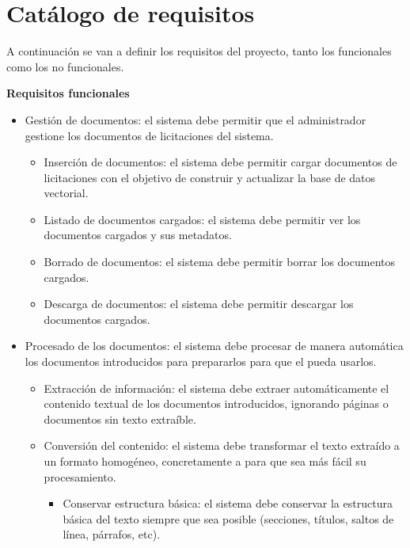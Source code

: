 \section{Catálogo de requisitos} \label{req:req}

A continuación se van a definir los requisitos del proyecto, tanto los funcionales como los no funcionales.

\textbf{Requisitos funcionales}

\begin{itemize}
\tightlist
	\item {} Gestión de documentos: el sistema debe permitir que el administrador gestione los documentos de licitaciones del sistema. 
	\begin{itemize}
	\tightlist
		\item {} Inserción de documentos: el sistema debe permitir cargar documentos de licitaciones con el objetivo de construir y actualizar la base de datos vectorial.
		\item {} Listado de documentos cargados: el sistema debe permitir ver los documentos cargados y sus metadatos.
		\item {} Borrado de documentos: el sistema debe permitir borrar los documentos cargados.
		\item {} Descarga de documentos: el sistema debe permitir descargar los documentos cargados.
	\end{itemize}
	\item {} Procesado de los documentos: el sistema debe procesar de manera automática los documentos introducidos para prepararlos para que el  pueda usarlos.
	\begin{itemize}
	\tightlist
		\item {} Extracción de información: el sistema debe extraer automáticamente el contenido textual de los documentos introducidos, ignorando páginas o documentos sin texto extraíble.
		\item {} Conversión del contenido: el sistema debe transformar el texto extraído a un formato homogéneo, concretamente a  para que sea más fácil su procesamiento.
		\begin{itemize}
		\tightlist
			\item {} Conservar estructura básica: el sistema debe conservar la estructura básica del texto siempre que sea posible (secciones, títulos, saltos de línea, párrafos, etc).
		\end{itemize}

\end{itemize}
\end{itemize}
